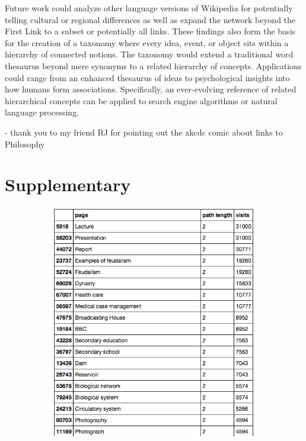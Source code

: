 \documentclass[twoside]{article}
\begin{document}
Future work could analyze other language versions of Wikipedia for potentially telling cultural or regional differences as well as expand the network beyond the First Link to a subset or potentially all links.
These findings also form the basis for the creation of a taxonomy where 
every idea, event, or object sits within a hierarchy of connected notions.
The taxonomy would extend a traditional word thesaurus beyond mere synonyms to a related hierarchy of concepts.
Applications could range from an enhanced thesaurus of ideas to psychological insights into how humans form associations.
Specifically, an ever-evolving reference of related hierarchical concepts can be applied to search engine algorithms 
or natural language processing.



- thank you to my friend RJ for pointing out the xkcdc comic about links to Philosophy


\newpage 

\section{Supplementary}

\begin{figure}[H]
\centering
\caption{highest ranking 2-Cycles}
    \begin{subfigure}[b]{0.8\textwidth}
        \includegraphics[width=\textwidth]{graphics/top_2loops.png}
    \end{subfigure}
\end{figure}
\end{document}
